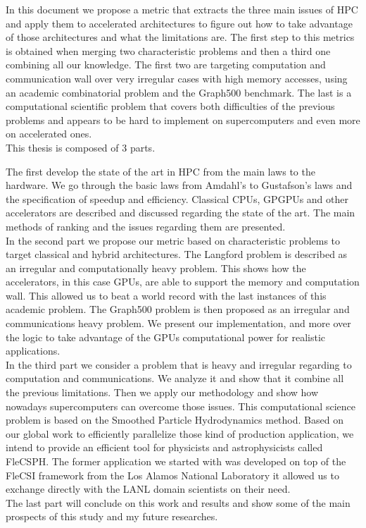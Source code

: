 In this document we propose a metric that extracts the three main issues of HPC and apply them to accelerated architectures to figure out how to take advantage of those architectures and what the limitations are. 
The first step to this metrics is obtained when merging two characteristic problems and then a third one combining all our knowledge.
The first two are targeting computation and communication wall over very irregular cases with high memory accesses, using an academic combinatorial problem and the Graph500 benchmark. 
The last is a computational scientific problem that covers both difficulties of the previous problems and appears to be hard to implement on supercomputers and even more on accelerated ones.\\

This thesis is composed of 3 parts.

The first develop the state of the art in HPC from the main laws to the hardware. 	
We go through the basic laws from Amdahl's to Gustafson's laws and the specification of speedup and efficiency.
Classical CPUs, GPGPUs and other accelerators are described and discussed regarding the state of the art. 
The main methods of ranking and the issues regarding them are presented.\\ 

In the second part we propose our metric based on characteristic problems to target classical and hybrid architectures.
The Langford problem is described as an irregular and computationally heavy problem.
This shows how the accelerators, in this case GPUs, are able to support the memory and computation wall. 
This allowed us to beat a world record with the last instances of this academic problem.
The Graph500 problem is then proposed as an irregular and communications heavy problem. 
We present our implementation, and more over the logic to take advantage of the GPUs computational power for realistic applications. \\

In the third part we consider a problem that is heavy and irregular regarding to computation and communications.
We analyze it and show that it combine all the previous limitations. 
Then we apply our methodology and show how nowadays supercomputers can overcome those issues. 
This computational science problem is based on the Smoothed Particle Hydrodynamics method.
Based on our global work to efficiently parallelize those kind of production application, we intend to provide an efficient tool for physicists and astrophysicists called FleCSPH. 
The former application we started with was developed on top of the FleCSI framework from the Los Alamos National Laboratory it allowed us to exchange directly with the LANL domain scientists on their need.\\

The last part will conclude on this work and results and show some of the main prospects of this study and my future researches. 